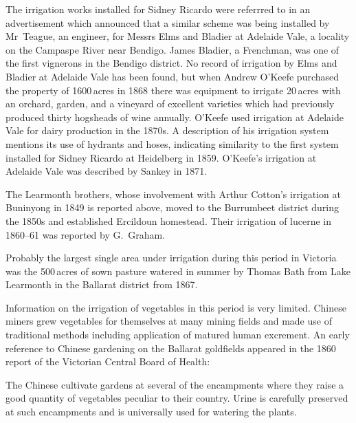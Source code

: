 The irrigation works installed for Sidney Ricardo were referrred to in
an advertisement which announced that a similar scheme was being
installed by Mr~Teague, an engineer, for Messrs Elms and Bladier at
Adelaide Vale, a locality on the Campaspe River 
near Bendigo.  James Bladier, 
a Frenchman, was one of the first vignerons  in the
Bendigo district.  No record of irrigation by Elms and Bladier at
Adelaide Vale  has been found, but when
Andrew O'Keefe  purchased the property of
1600\,acres in 1868 there was equipment to irrigate 20\,acres with an
orchard,
 garden,  and a
vineyard  of excellent varieties which had previously
produced thirty hogsheads of wine annually.  O'Keefe used irrigation
at Adelaide Vale for dairy  production in the 1870s.  A
description of his irrigation system mentions its use of hydrants and
hoses, indicating similarity to the first system installed for Sidney
Ricardo at Heidelberg in 1859.  O'Keefe's irrigation at Adelaide Vale
was described by Sankey in 1871.

The Learmonth brothers,  whose involvement with
Arthur Cotton's irrigation at Buninyong in 1849 is reported above,
moved to the Burrumbeet  district during the
1850s and established Ercildoun 
homestead. Their irrigation of lucerne  in 1860--61 was
reported by G.~Graham.

Probably the largest single area under irrigation during this period
in Victoria was the 500\,acres of sown pasture watered in summer by
Thomas Bath  from Lake Learmonth
 in the Ballarat 
district from 1867.

Information on the irrigation of vegetables in this period is very
limited.  Chinese miners  grew vegetables for
themselves at many mining fields and made use of traditional methods
including application of matured human excrement.  An early reference to Chinese gardening on the Ballarat
goldfields appeared in the 1860 report of the Victorian Central Board
of Health:
\begin{Quote}
	The Chinese cultivate gardens at several of the encampments
	wh\-ere they raise a good quantity of vegetables peculiar to
	their country.  Urine is carefully preserved at such
	encampments and is universally used for watering the
	plants.
\end{Quote}

